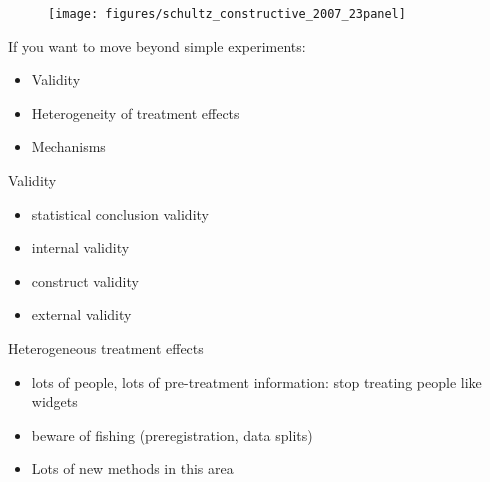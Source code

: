 \documentclass[aspectratio=169]{beamer}
\begin{document}
\begin{frame}

\begin{figure}
  \centering
  \texttt{[image: figures/schultz\_constructive\_2007\_23panel]}
\end{figure}

\end{frame}
\begin{frame}

If you want to move beyond simple experiments:
\begin{itemize}
\item Validity
\item Heterogeneity of treatment effects
\item Mechanisms
\end{itemize}

\end{frame}
\begin{frame}

Validity \pause
\begin{itemize}
\item statistical conclusion validity
\item internal validity
\item construct validity
\item external validity
\end{itemize}

\end{frame}
\begin{frame}

Heterogeneous treatment effects \pause
\begin{itemize}
\item lots of people, lots of pre-treatment information: stop treating people like widgets
\pause
\item beware of fishing (preregistration, data splits)
\pause
\item Lots of new methods in this area
\end{itemize}

\end{frame}
\end{document}
